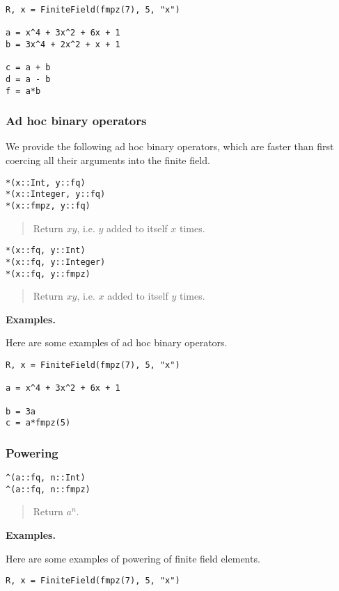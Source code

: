 \documentclass[a4paper,10pt]{article}
\newcommand{\desc}[1]{\vspace{-3mm}\begin{quote}#1\end{quote}}
\begin{document}
{{\begin{lstlisting}
R, x = FiniteField(fmpz(7), 5, "x")

a = x^4 + 3x^2 + 6x + 1
b = 3x^4 + 2x^2 + x + 1

c = a + b
d = a - b
f = a*b
\end{lstlisting}

\subsubsection{Ad hoc binary operators}

We provide the following ad hoc binary operators, which are faster than first
coercing all their arguments into the finite field.

\begin{lstlisting}
*(x::Int, y::fq)
*(x::Integer, y::fq)
*(x::fmpz, y::fq)
\end{lstlisting}

\desc{Return $xy$, i.e. $y$ added to itself $x$ times.}

\begin{lstlisting}
*(x::fq, y::Int)
*(x::fq, y::Integer)
*(x::fq, y::fmpz)
\end{lstlisting}

\desc{Return $xy$, i.e. $x$ added to itself $y$ times.}

\textbf{Examples.}

Here are some examples of ad hoc binary operators.

\begin{lstlisting}
R, x = FiniteField(fmpz(7), 5, "x")

a = x^4 + 3x^2 + 6x + 1

b = 3a
c = a*fmpz(5)
\end{lstlisting}

\subsubsection{Powering}

\begin{lstlisting}
^(a::fq, n::Int)
^(a::fq, n::fmpz)
\end{lstlisting}

\desc{Return $a^n$.}

\textbf{Examples.}

Here are some examples of powering of finite field elements.

\begin{lstlisting}
R, x = FiniteField(fmpz(7), 5, "x")


\end{lstlisting}}}
\end{document}
